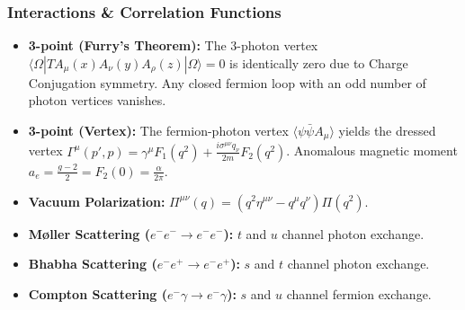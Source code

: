 \documentclass{article}
\begin{document}
\subsubsection*{Interactions \& Correlation Functions}
\begin{itemize}
    \item \textbf{3-point (Furry's Theorem):} The 3-photon vertex $\langle \Omega | T A_\mu(x) A_\nu(y) A_\rho(z) | \Omega \rangle = 0$ is identically zero due to Charge Conjugation symmetry. Any closed fermion loop with an odd number of photon vertices vanishes.
    \item \textbf{3-point (Vertex):} The fermion-photon vertex $\langle \psi \bar{\psi} A_\mu \rangle$ yields the dressed vertex $\Gamma^\mu(p',p) = \gamma^\mu F_1(q^2) + \frac{i\sigma^{\mu\nu}q_\nu}{2m} F_2(q^2)$. Anomalous magnetic moment $a_e = \frac{g-2}{2} = F_2(0) = \frac{\alpha}{2\pi}$.
    \item \textbf{Vacuum Polarization:} $\Pi^{\mu\nu}(q) = (q^2\eta^{\mu\nu} - q^\mu q^\nu)\Pi(q^2)$.
    \item \textbf{Møller Scattering ($e^- e^- \to e^- e^-$):} $t$ and $u$ channel photon exchange.
    \item \textbf{Bhabha Scattering ($e^- e^+ \to e^- e^+$):} $s$ and $t$ channel photon exchange.
    \item \textbf{Compton Scattering ($e^- \gamma \to e^- \gamma$):} $s$ and $u$ channel fermion exchange.
\end{itemize}
\end{document}
